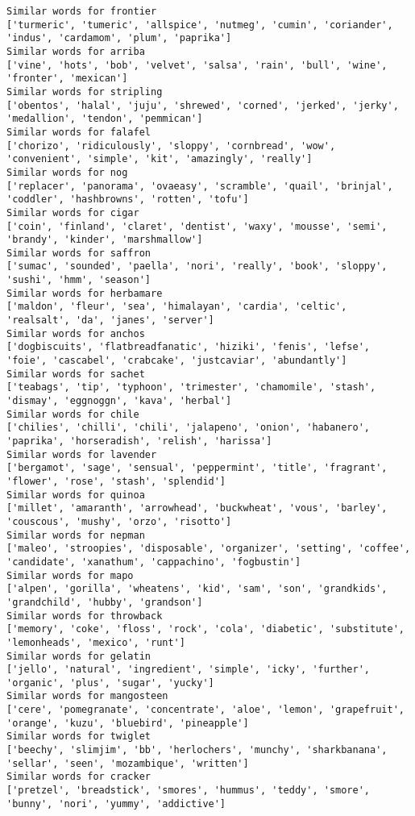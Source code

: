 \documentclass[11pt]{article}
\begin{document}
\begin{Verbatim}[commandchars=\\\{\}]
Similar words for frontier
['turmeric', 'tumeric', 'allspice', 'nutmeg', 'cumin', 'coriander', 'indus', 'cardamom', 'plum', 'paprika']
Similar words for arriba
['vine', 'hots', 'bob', 'velvet', 'salsa', 'rain', 'bull', 'wine', 'fronter', 'mexican']
Similar words for stripling
['obentos', 'halal', 'juju', 'shrewed', 'corned', 'jerked', 'jerky', 'medallion', 'tendon', 'pemmican']
Similar words for falafel
['chorizo', 'ridiculously', 'sloppy', 'cornbread', 'wow', 'convenient', 'simple', 'kit', 'amazingly', 'really']
Similar words for nog
['replacer', 'panorama', 'ovaeasy', 'scramble', 'quail', 'brinjal', 'coddler', 'hashbrowns', 'rotten', 'tofu']
Similar words for cigar
['coin', 'finland', 'claret', 'dentist', 'waxy', 'mousse', 'semi', 'brandy', 'kinder', 'marshmallow']
Similar words for saffron
['sumac', 'sounded', 'paella', 'nori', 'really', 'book', 'sloppy', 'sushi', 'hmm', 'season']
Similar words for herbamare
['maldon', 'fleur', 'sea', 'himalayan', 'cardia', 'celtic', 'realsalt', 'da', 'janes', 'server']
Similar words for anchos
['dogbiscuits', 'flatbreadfanatic', 'hiziki', 'fenis', 'lefse', 'foie', 'cascabel', 'crabcake', 'justcaviar', 'abundantly']
Similar words for sachet
['teabags', 'tip', 'typhoon', 'trimester', 'chamomile', 'stash', 'dismay', 'eggnoggn', 'kava', 'herbal']
Similar words for chile
['chilies', 'chilli', 'chili', 'jalapeno', 'onion', 'habanero', 'paprika', 'horseradish', 'relish', 'harissa']
Similar words for lavender
['bergamot', 'sage', 'sensual', 'peppermint', 'title', 'fragrant', 'flower', 'rose', 'stash', 'splendid']
Similar words for quinoa
['millet', 'amaranth', 'arrowhead', 'buckwheat', 'vous', 'barley', 'couscous', 'mushy', 'orzo', 'risotto']
Similar words for nepman
['maleo', 'stroopies', 'disposable', 'organizer', 'setting', 'coffee', 'candidate', 'xanathum', 'cappachino', 'fogbustin']
Similar words for mapo
['alpen', 'gorilla', 'wheatens', 'kid', 'sam', 'son', 'grandkids', 'grandchild', 'hubby', 'grandson']
Similar words for throwback
['memory', 'coke', 'floss', 'rock', 'cola', 'diabetic', 'substitute', 'lemonheads', 'mexico', 'runt']
Similar words for gelatin
['jello', 'natural', 'ingredient', 'simple', 'icky', 'further', 'organic', 'plus', 'sugar', 'yucky']
Similar words for mangosteen
['cere', 'pomegranate', 'concentrate', 'aloe', 'lemon', 'grapefruit', 'orange', 'kuzu', 'bluebird', 'pineapple']
Similar words for twiglet
['beechy', 'slimjim', 'bb', 'herlochers', 'munchy', 'sharkbanana', 'sellar', 'seen', 'mozambique', 'written']
Similar words for cracker
['pretzel', 'breadstick', 'smores', 'hummus', 'teddy', 'smore', 'bunny', 'nori', 'yummy', 'addictive']

\end{Verbatim}
\end{document}
